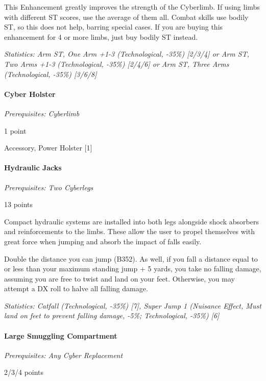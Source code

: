 \begin{multicols*}{3}
	This Enhancement greatly improves the strength of the Cyberlimb. If using limbs with different ST scores, use the average of them all. Combat skills use bodily ST, so this does not help, barring special cases. If you are buying this enhancement for 4 or more limbs, just buy bodily ST instead. 
	
	\textit{\textcolor{OliveGreen}{Statistics: Arm ST, One Arm +1-3 (Technological, -35\%) [2/3/4] or Arm ST, Two Arms +1-3 (Technological, -35\%) [2/4/6] or Arm ST, Three Arms (Technological, -35\%) [3/6/8]}}
	
	
	\paragraph{Cyber Holster}
	\textit{Prerequisites: Cyberlimb}
	\begin{flushright}
		1 point
	\end{flushright}
	
	Accessory, Power Holster [1]
	
	\paragraph{Hydraulic Jacks}
	\textit{Prerequisites: Two Cyberlegs}
	\begin{flushright}
		13 points
	\end{flushright}
	
	Compact hydraulic systems are installed into both legs alongside shock absorbers and reinforcements to the limbs. These  allow the user to propel themselves with great force when jumping and absorb the impact of falls easily.
	
	Double the distance you can jump (B352). As well, if you fall a distance equal to or less than your maximum standing jump + 5 yards, you take no falling damage, assuming you are free to twist and land on your feet. Otherwise, you may attempt a DX roll to halve all falling damage.
	
	\textit{\textcolor{OliveGreen}{Statistics: Catfall (Technological, -35\%) [7], Super Jump 1 (Nuisance Effect, Must land on feet to prevent falling damage, -5\%; Technological, -35\%) [6]}}
	
	\paragraph{Large Smuggling Compartment}
	\textit{Prerequisites: Any Cyber Replacement}
	\begin{flushright}
		2/3/4 points
	\end{flushright}
	

\end{multicols*}
